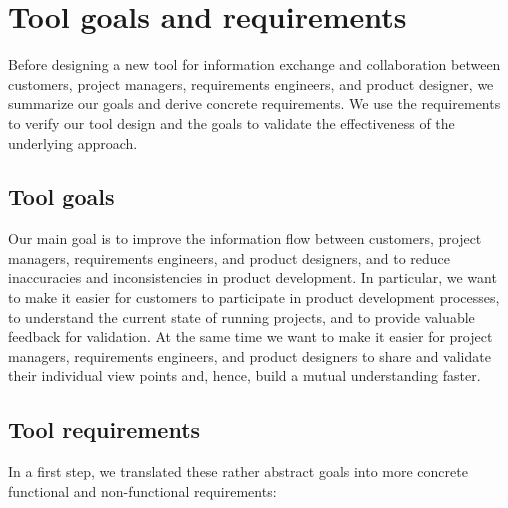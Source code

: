 \section{Tool goals and requirements}
\label{sec:requirements}

Before designing a new tool for information exchange and collaboration between customers, project managers, requirements engineers, and product designer, we summarize our goals and derive concrete requirements.
We use the requirements to verify our tool design and the goals to validate the effectiveness of the underlying approach.

\subsection{Tool goals}

Our main goal is to improve the information flow between customers, project managers, requirements engineers, and product designers, and to reduce inaccuracies and inconsistencies in product development.
In particular, we want to make it easier for customers to participate in product development processes, to understand the current state of running projects, and to provide valuable feedback for validation.
At the same time we want to make it easier for project managers, requirements engineers, and product designers to share and validate their individual view points and, hence, build a mutual understanding faster.

\subsection{Tool requirements}

In a first step, we translated these rather abstract goals into more concrete functional and non-functional requirements:

